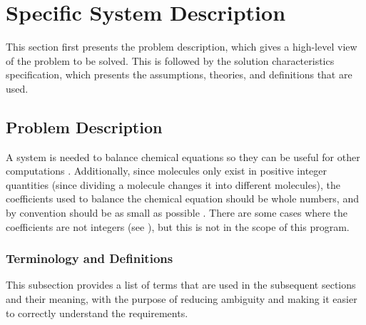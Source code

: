 \documentclass[12pt]{article}
\begin{document}
\section{Specific System Description}
\label{Sec:SpecSystDesc}
This section first presents the problem description, which gives a high-level view of the problem to be solved. This is followed by the solution characteristics specification, which presents the assumptions, theories, and definitions that are used.

\subsection{Problem Description}
\label{Sec:ProbDesc}
A system is needed to balance chemical equations so they can be useful for other computations \cite{lund2023}. Additionally, since molecules only exist in positive integer quantities (since dividing a molecule changes it into different molecules), the coefficients used to balance the chemical equation should be whole numbers, and by convention should be as small as possible \cite{lund2023}. There are some cases where the coefficients are not integers (see \cite{nonIntCoeffSource}), but this is not in the scope of this program.

\subsubsection{Terminology and Definitions}
\label{Sec:TermDefs}
This subsection provides a list of terms that are used in the subsequent sections and their meaning, with the purpose of reducing ambiguity and making it easier to correctly understand the requirements.
\end{document}

